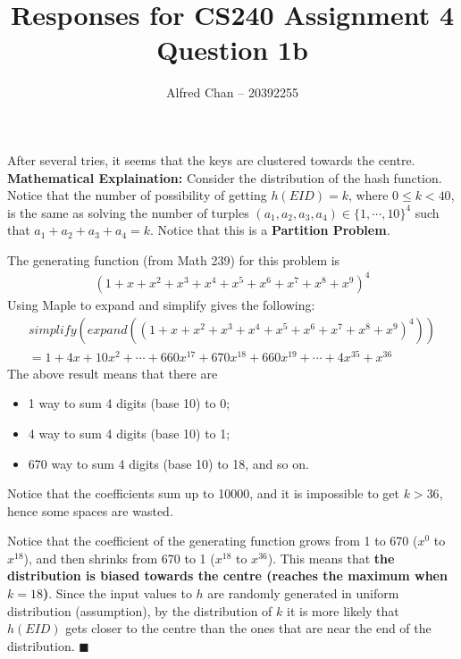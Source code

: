 \documentclass[12pt]{article}
\title{Responses for CS240 Assignment 4 Question 1b}
\author{Alfred Chan -- 20392255}
\begin{document}
\maketitle
After several tries, it seems that the keys are clustered towards the centre.\\

{\bf Mathematical Explaination:} Consider the distribution of the hash function.
Notice that the number of possibility of getting $h(EID) = k$,
where $0 \le k < 40$, is the same as solving the number of turples 
	$(a_1,a_2,a_3,a_4) \in \{1, \cdots, 10\}^4$ such that $a_1 + a_2 + a_3 + a_4 = k$.
Notice that this is a {\bf Partition Problem}.

The generating function (from Math 239) for this problem is
\begin{align}
(1+x+x^2+x^3+x^4+x^5+x^6+x^7+x^8+x^9)^4
\end{align}
Using Maple to expand and simplify gives the following:
\begin{gather*}
simplify(expand((1+x+x^2+x^3+x^4+x^5+x^6+x^7+x^8+x^9)^4))\\
= 1+4x+10x^2+ \cdots
	+ 660x^{17} + 670x^{18} + 660x^{19} + \cdots
	+ 4x^{35} + x^{36}
\end{gather*}
The above result means that there are
\begin{itemize}
\item 1 way to sum 4 digits (base 10) to 0;
\item 4 way to sum 4 digits (base 10) to 1;
\item 670 way to sum 4 digits (base 10) to 18, and so on.
\end{itemize}
Notice that the coefficients sum up to 10000, and it is impossible to get $k > 36$, hence some spaces are wasted.

Notice that the coefficient of the generating function
	grows from 1 to 670 ($x^{0}$ to $x^{18}$),
	and then shrinks from 670 to 1 ($x^{18}$ to $x^{36}$).
This means that {\bf the distribution is biased towards the centre (reaches the maximum when $k=18$)}.
Since the input values to $h$ are randomly generated in uniform distribution (assumption),
by the distribution of $k$ it is more likely that $h(EID)$ gets closer to the centre than the ones that are near the end of the distribution.
\hfill $\blacksquare$
\end{document}
